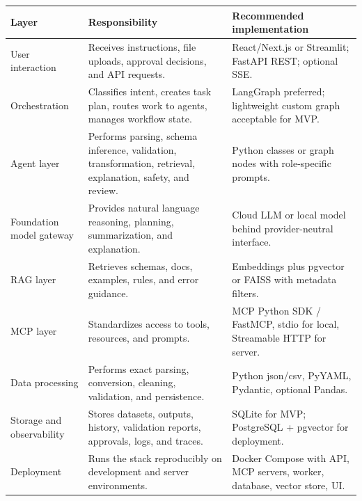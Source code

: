 \begin{longtable}{p{}p{}p{}}
\toprule
\textbf{Layer} & \textbf{Responsibility} & \textbf{Recommended implementation} \\
\midrule
User interaction & Receives instructions, file uploads, approval decisions, and API requests. & React/Next.js or Streamlit; FastAPI REST; optional SSE. \\
Orchestration & Classifies intent, creates task plan, routes work to agents, manages workflow state. & LangGraph preferred; lightweight custom graph acceptable for MVP. \\
Agent layer & Performs parsing, schema inference, validation, transformation, retrieval, explanation, safety, and review. & Python classes or graph nodes with role-specific prompts. \\
Foundation model gateway & Provides natural language reasoning, planning, summarization, and explanation. & Cloud LLM or local model behind provider-neutral interface. \\
RAG layer & Retrieves schemas, docs, examples, rules, and error guidance. & Embeddings plus pgvector or FAISS with metadata filters. \\
MCP layer & Standardizes access to tools, resources, and prompts. & MCP Python SDK / FastMCP, stdio for local, Streamable HTTP for server. \\
Data processing & Performs exact parsing, conversion, cleaning, validation, and persistence. & Python json/csv, PyYAML, Pydantic, optional Pandas. \\
Storage and observability & Stores datasets, outputs, history, validation reports, approvals, logs, and traces. & SQLite for MVP; PostgreSQL + pgvector for deployment. \\
Deployment & Runs the stack reproducibly on development and server environments. & Docker Compose with API, MCP servers, worker, database, vector store, UI. \\
\bottomrule
\end{longtable}
